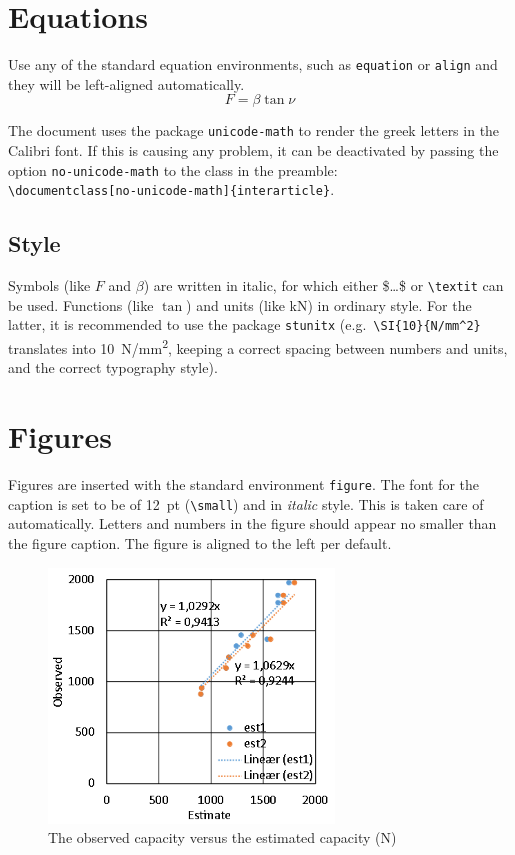 \documentclass[unicode-math,microtype]{interarticle}
\newcommand\comm[1]{\texttt{\textbackslash #1}}
\begin{document}
\section{Equations}
Use any of the standard equation environments, such as \texttt{equation} or \texttt{align} and they will be left-aligned automatically.
%
\begin{equation}
  F=\beta \tan \nu
  \label{eq:eq1}
\end{equation}

The document uses the package \texttt{unicode-math} to render the greek letters in the Calibri font.
If this is causing any problem, it can be deactivated by passing the option \texttt{no-unicode-math} to the class in the preamble: \\
\comm{documentclass[no-unicode-math]\{interarticle\}}.

\subsection{Style}
Symbols (like $F$ and $\beta$) are written in italic, for which either \$\ldots\$ or \comm{textit} can be used.
Functions (like $\tan$) and units (like \si{kN}) in ordinary style.
For the latter, it is recommended to use the package \texttt{stunitx} (e.g.\ \comm{SI\{10\}\{N/mm\^{}2\}} translates into \SI{10}{N/mm^2}, keeping a correct spacing between numbers and units, and the correct typography style).

\section{Figures}
Figures are inserted with the standard environment \texttt{figure}.
The font for the caption is set to be of \SI{12}{pt} (\comm{small}) and in \textit{italic} style.
This is taken care of automatically.
Letters and numbers in the figure should appear no smaller than the figure caption.
The figure is aligned to the left per default.\par

\begin{figure}[htb]
  \includegraphics[width=7.6cm]{./img/figure1.png}
  \caption{The observed capacity versus the estimated capacity (\si{N})}%
  \label{fig:figure1}%
\end{figure}
\end{document}
